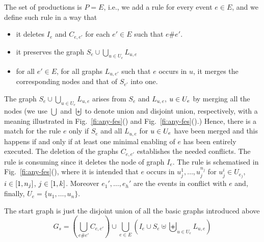 The set of productions is $P = E$, i.e., we add a rule for every event $e \in E$, and we define such rule in a way that
\begin{itemize}

\item it deletes $I_e$ and  $C_{e,e'}$ for each $e' \in E$ such that $e \# e'$.
\item it preserves the graph $S_e \cup \bigcup_{u \in U_e} L_{u,e}$ 

\item for all $e' \in E$, for all graphs $L_{u,e'}$ such that
  $e$ occurs in $u$, it merges the corresponding nodes and that of $S_{e'}$ into one.

\end{itemize}
The graph $S_e \cup \bigcup_{u \in U_e} L_{u,e}$ arises from $S_e$ and
$L_{u,e}$, $u \in U_{e}$ by merging all the nodes (we use $\bigcup$
and $\biguplus$ to denote union and disjoint union, respectively, with
a meaning illustrated in Fig.~\ref{fi:any-fes}()
and Fig.~\ref{fi:any-fes}().) Hence, there is a match for the
rule $e$ only if $S_e$ and all $L_{u,e}$ for $u \in U_{e}$ have been merged
and this happens if and only if at least one minimal enabling of $e$
has been entirely executed.  The deletion of the graphs $C_{e,e'}$ establishes the
needed conflicts. The rule is consuming since it deletes the node of graph
$I_e$.
%
%
The rule is schematised in
Fig.~\ref{fi:any-fes}(), where it is intended
that $e$ occurs in $u_j^1, \ldots, u_j^{n_j}$ for $u_j^i \in U_{e_j}$,
$i \in [{1},{n_j}]$, $j \in [{1},{k}]$. Moreover
$e_1', \ldots, e_h'$ are the events in conflict with $e$ and, finally,
$U_e = \{ u_1, \ldots, u_n \}$.


The start graph is just the disjoint union of all the basic graphs
introduced above
\[
  G_s = (\bigcup_{e\#e'} C_{e,e'}) \cup
  \bigcup_{e \in E}  (I_e \cup S_e \uplus \biguplus_{u \in U_e} L_{u,e})
\]

